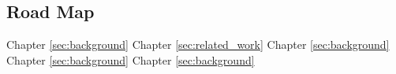 \subsection{Road Map}

Chapter \ref{sec:background}
Chapter \ref{sec:related_work}
Chapter \ref{sec:background}
Chapter \ref{sec:background}
Chapter \ref{sec:background}